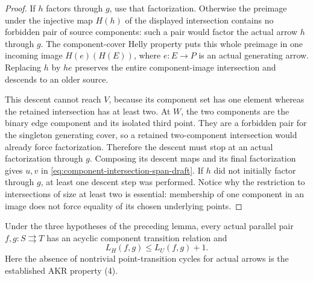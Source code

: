 \begin{proof}
If $h$ factors through $g$, use that factorization. Otherwise
the preimage under the injective map $H(h)$ of the displayed
intersection contains no forbidden pair of source components:
such a pair would factor the actual arrow $h$ through $g$.
The component-cover Helly property puts this whole preimage in
one incoming image $H(e)(H(E))$, where $e:E\to P$ is an actual
generating arrow. Replacing $h$ by $he$ preserves the entire
component-image intersection and descends to an older source.

This descent cannot reach $V$, because its component set has one
element whereas the retained intersection has at least two.
At $W$, the two components are the binary edge component and its
isolated third point. They are a forbidden pair for the singleton
generating cover, so a retained two-component intersection would
already force factorization. Therefore the descent must stop
at an actual factorization through $g$. Composing its descent
maps and its final factorization gives $u,v$ in
\eqref{eq:component-intersection-span-draft}. If $h$ did not
initially factor through $g$, at least one descent step was
performed. Notice why the restriction to intersections of size
at least two is essential: membership of one component in an
image does not force equality of its chosen underlying points.
\end{proof}

\begin{lemma}
\label{C:component-path-inflation-draft}
Under the three hypotheses of the preceding lemma, every actual
parallel pair $f,g:S\rightrightarrows T$ has an acyclic component
transition relation and
\[
                           L_H(f,g)\leq L_U(f,g)+1.
 \tag{PB}\label{eq:component-path-bound-draft}
\]
Here the absence of nontrivial point-transition cycles for actual
arrows is the established AKR property (4).
\end{lemma}

